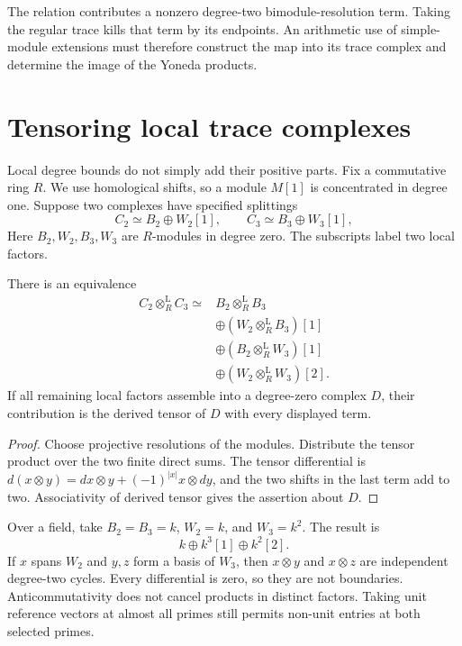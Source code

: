 The relation contributes a nonzero degree-two bimodule-resolution term.
Taking the regular trace kills that term by its endpoints. An arithmetic use
of simple-module extensions must therefore construct the map into its trace
complex and determine the image of the Yoneda products.

\section{Tensoring local trace complexes}

Local degree bounds do not simply add their positive parts. Fix a
commutative ring $R$. We use homological shifts, so a module $M[1]$ is
concentrated in degree one. Suppose two complexes have specified splittings
\[
 C_2\simeq B_2\oplus W_2[1],\qquad
 C_3\simeq B_3\oplus W_3[1],
\]
Here $B_2,W_2,B_3,W_3$ are $R$-modules in degree zero. The subscripts label
two local factors.

\begin{proposition}
\label{v4-arith:traces:four-terms}
There is an equivalence
\begin{align*}
 C_2\otimes_R^{\mathrm L}C_3\simeq{}&
 B_2\otimes_R^{\mathrm L}B_3\\
 &\oplus(W_2\otimes_R^{\mathrm L}B_3)[1]\\
 &\oplus(B_2\otimes_R^{\mathrm L}W_3)[1]\\
 &\oplus(W_2\otimes_R^{\mathrm L}W_3)[2].
\end{align*}
If all remaining local factors assemble into a degree-zero complex $D$,
their contribution is the derived tensor of $D$ with every displayed term.
\end{proposition}
\begin{proof}
Choose projective resolutions of the modules. Distribute the tensor product
over the two finite direct sums. The tensor differential is $d(x\otimes
y)=dx\otimes y+(-1)^{|x|}x\otimes dy$, and the two shifts in the last term
add to two. Associativity of derived tensor gives the assertion about $D$.
\end{proof}

Over a field, take $B_2=B_3=k$, $W_2=k$, and $W_3=k^2$. The result is
\[
 k\oplus k^3[1]\oplus k^2[2].
\]
If $x$ spans $W_2$ and $y,z$ form a basis of $W_3$, then $x\otimes y$ and
$x\otimes z$ are independent degree-two cycles. Every differential is zero,
so they are not boundaries. Anticommutativity does not cancel products in
distinct factors. Taking unit reference vectors at almost all primes still
permits non-unit entries at both selected primes.

